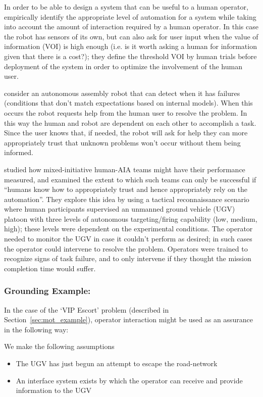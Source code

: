 In order to be able to design a system that can be useful to a human operator, \citet{Kaupp2008-yr,Kaupp2005-pk} empirically identify the appropriate level of automation for a system while taking into account the amount of interaction required by a human operator. In this case the robot has sensors of its own, but can also ask for user input when the value of information (VOI) is high enough (i.e. is it worth asking a human for information given that there is a cost?); they define the threshold VOI by human trials before deployment of the system in order to optimize the involvement of the human user.

\citet{Tellex2014-uc} consider an autonomous assembly robot that can detect when it has failures (conditions that don't match expectations based on internal models). When this occurs the robot requests help from the human user to resolve the problem. In this way the human and robot are dependent on each other to accomplish a task. Since the user knows that, if needed, the robot will ask for help they can more appropriately trust that unknown problems won't occur without them being informed.

\citet{Freedy2007-sg} studied how mixed-initiative human-AIA teams might have their performance measured, and examined the extent to which such teams can only be successful if ``humans know how to appropriately trust and hence appropriately rely on the automation''. They explore this idea by using a tactical reconnaissance scenario where human participants supervised an unmanned ground vehicle (UGV)  platoon with three levels of autonomous targeting/firing capability (low, medium, high); these levels were dependent on the experimental conditions. The operator needed to monitor the UGV in case it couldn't perform as desired; in such cases the operator could intervene to resolve the problem. Operators were trained to recognize signs of task failure, and to only intervene if they thought the mission completion time would suffer.

\subsubsection{Grounding Example:}
In the case of the `VIP Escort' problem (described in Section~\ref{sec:mot_example}), operator interaction might be used as an assurance in the following way:

We make the following assumptions

\begin{itemize}
    \item The UGV has just begun an attempt to escape the road-network
    \item An interface system exists by which the operator can receive and provide information to the UGV
\end{itemize}

